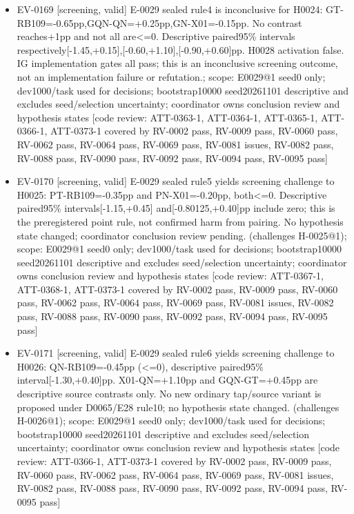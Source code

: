\documentclass[11pt]{article}
\begin{document}
\begin{itemize}
\item EV-0169 [screening, valid] E-0029 sealed rule4 is inconclusive for H0024: GT-RB109=-0.65pp,GQN-QN=+0.25pp,GN-X01=-0.15pp. No contrast reaches+1pp and not all are\textless{}=0. Descriptive paired95\% intervals respectively[-1.45,+0.15],[-0.60,+1.10],[-0.90,+0.60]pp. H0028 activation false. IG implementation gates all pass; this is an inconclusive screening outcome, not an implementation failure or refutation.; scope: E0029@1 seed0 only; dev1000/task used for decisions; bootstrap10000 seed20261101 descriptive and excludes seed/selection uncertainty; coordinator owns conclusion review and hypothesis states [code review: ATT-0363-1, ATT-0364-1, ATT-0365-1, ATT-0366-1, ATT-0373-1 covered by RV-0002 pass, RV-0009 pass, RV-0060 pass, RV-0062 pass, RV-0064 pass, RV-0069 pass, RV-0081 issues, RV-0082 pass, RV-0088 pass, RV-0090 pass, RV-0092 pass, RV-0094 pass, RV-0095 pass]
\item EV-0170 [screening, valid] E-0029 sealed rule5 yields screening challenge to H0025: PT-RB109=-0.35pp and PN-X01=-0.20pp, both\textless{}=0. Descriptive paired95\% intervals[-1.15,+0.45] and[-0.80125,+0.40]pp include zero; this is the preregistered point rule, not confirmed harm from pairing. No hypothesis state changed; coordinator conclusion review pending. (challenges H-0025@1); scope: E0029@1 seed0 only; dev1000/task used for decisions; bootstrap10000 seed20261101 descriptive and excludes seed/selection uncertainty; coordinator owns conclusion review and hypothesis states [code review: ATT-0367-1, ATT-0368-1, ATT-0373-1 covered by RV-0002 pass, RV-0009 pass, RV-0060 pass, RV-0062 pass, RV-0064 pass, RV-0069 pass, RV-0081 issues, RV-0082 pass, RV-0088 pass, RV-0090 pass, RV-0092 pass, RV-0094 pass, RV-0095 pass]
\item EV-0171 [screening, valid] E-0029 sealed rule6 yields screening challenge to H0026: QN-RB109=-0.45pp (\textless{}=0), descriptive paired95\% interval[-1.30,+0.40]pp. X01-QN=+1.10pp and GQN-GT=+0.45pp are descriptive source contrasts only. No new ordinary tap/source variant is proposed under D0065/E28 rule10; no hypothesis state changed. (challenges H-0026@1); scope: E0029@1 seed0 only; dev1000/task used for decisions; bootstrap10000 seed20261101 descriptive and excludes seed/selection uncertainty; coordinator owns conclusion review and hypothesis states [code review: ATT-0366-1, ATT-0373-1 covered by RV-0002 pass, RV-0009 pass, RV-0060 pass, RV-0062 pass, RV-0064 pass, RV-0069 pass, RV-0081 issues, RV-0082 pass, RV-0088 pass, RV-0090 pass, RV-0092 pass, RV-0094 pass, RV-0095 pass]

\end{itemize}
\end{document}
